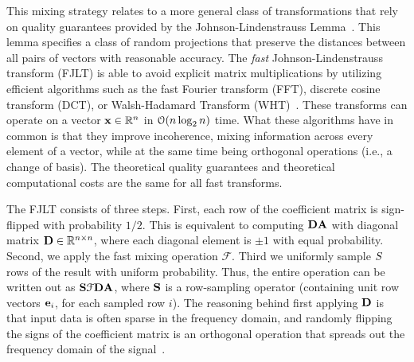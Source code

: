 This mixing strategy relates to a more general class of
transformations that rely on quality guarantees provided by the
Johnson-Lindenstrauss Lemma~\cite{jlt}. This lemma specifies a class
of random projections that preserve the distances between all pairs of
vectors with reasonable accuracy. The \emph{fast}
Johnson-Lindenstrauss transform (FJLT) is able to avoid explicit
matrix multiplications by utilizing efficient algorithms such as the
fast Fourier transform (FFT), discrete cosine transform (DCT), or
Walsh-Hadamard Transform (WHT)~\cite{fjlt}. These transforms can
operate on a vector $\V{x} \in \mathbb{R}^n$ in $\mathcal{O}({n\log_2 n})$
time. What these algorithms have in common is that
they improve incoherence, mixing information across every element of a vector, while at the
same time being orthogonal operations (i.e., a change of basis).  
The theoretical quality guarantees and theoretical computational costs are the same for all fast transforms.

The FJLT consists of three steps. First, each row of the coefficient
matrix is sign-flipped with probability $1/2$. This is equivalent to
computing $\M{D}\M{A}$ with diagonal matrix $\M{D}\in
\mathbb{R}^{n\times n}$, where each diagonal element is $\pm 1$ with
equal probability. Second, we apply the fast mixing operation
$\mathcal{F}$. Third we uniformly sample $S$ rows of the
result with uniform probability. Thus, the entire operation can be
written out as $\M{S}\mathcal{F}\M{D}\M{A}$, where $\M{S}$ is a row-sampling operator (containing unit row vectors $\V{e}_{i}$, for each sampled row $i$).
The reasoning behind first
applying $\M{D}$ is that input data is often sparse in the frequency
domain, and randomly flipping the signs of the coefficient matrix is an
orthogonal operation that spreads out the frequency domain of
the signal~\cite{fjlt}. 
%
